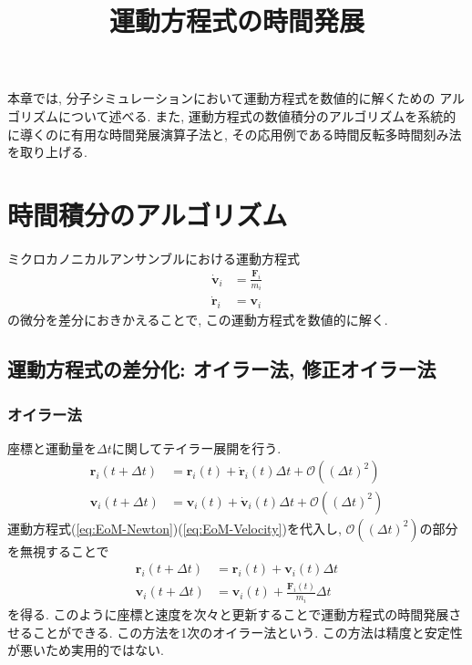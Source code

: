 






\title{運動方程式の時間発展}
\maketitle

本章では, 分子シミュレーションにおいて運動方程式を数値的に解くための
アルゴリズムについて述べる\cite{2000Okazaki, 2003Ueda}. 
また, 運動方程式の数値積分のアルゴリズムを系統的に導くのに有用な時間発展演算子法と, 
その応用例である時間反転多時間刻み法\cite{1992Tuckerman}を取り上げる. 

\section{時間積分のアルゴリズム}
ミクロカノニカルアンサンブルにおける運動方程式
\begin{align}
 \dot{\bm{v}}_{i} &= \frac{\bm{F}_{i}}{m_{i}} \label{eq:EoM-Newton} \\
 \dot{\bm{r}}_{i} &= \bm{v}_{i}               \label{eq:EoM-Velocity}
\end{align}
の微分を差分におきかえることで, この運動方程式を数値的に解く.

\subsection{運動方程式の差分化: オイラー法, 修正オイラー法}
\subsubsection{オイラー法}
座標と運動量を$\Delta t$に関してテイラー展開を行う.
\begin{align}
  \bm{r}_{i}(t + \Delta t)
&=\bm{r}_{i}(t)
 +\dot{\bm{r}}_{i} (t)\Delta t
 +\mathcal{O}((\Delta t)^{2})
  \\
  \bm{v}_{i}(t + \Delta t)
&=\bm{v}_{i}(t)
 +\dot{\bm{v}}_{i} (t)\Delta t
 +\mathcal{O}((\Delta t)^{2})
\end{align}
運動方程式(\ref{eq:EoM-Newton})(\ref{eq:EoM-Velocity})を代入し,
$\mathcal{O}((\Delta t)^{2})$の部分を無視することで
\begin{align}
  \bm{r}_{i}(t + \Delta t)
&=\bm{r}_{i}(t)
 +\bm{v}_{i}(t) \Delta t
  \\
  \bm{v}_{i}(t + \Delta t)
&=\bm{v}_{i}(t)
 +\frac{\bm{F}_{i}(t)}{m_{i}}\Delta t
\end{align}
を得る.
このように座標と速度を次々と更新することで運動方程式の時間発展させることができる.
この方法を1次のオイラー法という.
この方法は精度と安定性が悪いため実用的ではない.

